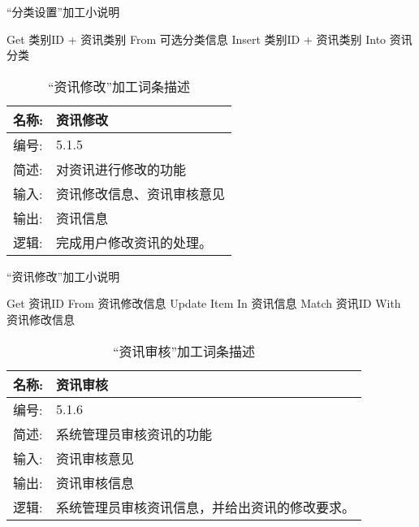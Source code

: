 \begin{algorithm}[H]
    \renewcommand{\thealgorithm}{}
    \caption{“分类设置”加工小说明} 
    \label{alg3} 
    \begin{algorithmic}[1]
        \STATE Get 类别ID + 资讯类别 From 可选分类信息
        \STATE Insert 类别ID + 资讯类别 Into 资讯分类
    \end{algorithmic} 
\end{algorithm}

\begin{table}[H]  
\caption{“资讯修改”加工词条描述}  
\begin{center}  
    \begin{tabular}{l p{11cm}} 
        \hline
        \quad 名称:  & 资讯修改 \\
        \hline
        \quad 编号:  & 5.1.5 \\
        \hline
        \quad 简述:  & 对资讯进行修改的功能 \\
        \hline
        \quad 输入:  & 资讯修改信息、资讯审核意见 \\
        \hline
        \quad 输出:  & 资讯信息 \\
        \hline
        \quad 逻辑:  & 完成用户修改资讯的处理。 \\
        \hline
    \end{tabular}
    \label{tab1}
\end{center}
\end{table}

\begin{algorithm}[H] 
    \renewcommand{\thealgorithm}{}
    \caption{“资讯修改”加工小说明} 
    \label{alg3} 
    \begin{algorithmic}[1]
        \STATE Get 资讯ID From 资讯修改信息
        \STATE Update Item In 资讯信息 Match 资讯ID With 资讯修改信息
    \end{algorithmic} 
\end{algorithm}

\begin{table}[H]  
\caption{“资讯审核”加工词条描述}  
\begin{center}  
    \begin{tabular}{l p{11cm}} 
        \hline
        \quad 名称:  &  资讯审核 \\
        \hline
        \quad 编号:  & 5.1.6 \\
        \hline
        \quad 简述:  & 系统管理员审核资讯的功能 \\
        \hline
        \quad 输入:  & 资讯审核意见 \\
        \hline
        \quad 输出:  & 资讯审核信息 \\
        \hline
        \quad 逻辑:  & 系统管理员审核资讯信息，并给出资讯的修改要求。 \\
        \hline
    \end{tabular}
    \label{tab1}
\end{center}
\end{table}

